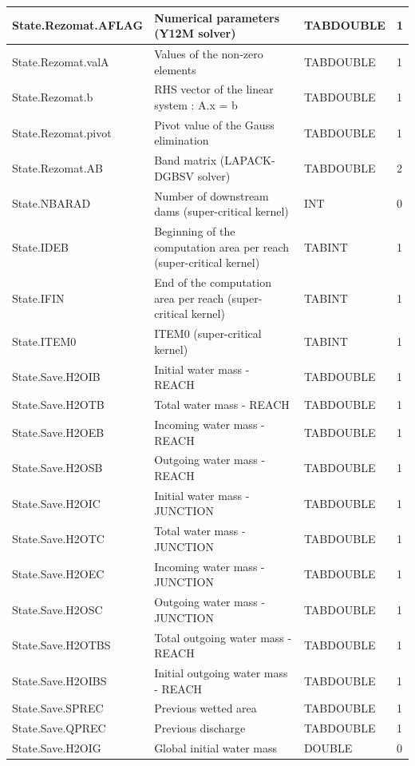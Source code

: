 \documentclass[a4paper,11pt]{article}
\begin{document}
\begin{landscape}
\begin{table}[ht]
\begin{center}
\begin{tabular}{|l|l|l|l|}
\hline  State.Rezomat.AFLAG & Numerical parameters (Y12M solver) & TABDOUBLE & 1 \\
\hline  State.Rezomat.valA & Values of the non-zero elements & TABDOUBLE & 1 \\
\hline  State.Rezomat.b & RHS vector of the linear system : A.x = b & TABDOUBLE & 1 \\
\hline  State.Rezomat.pivot & Pivot value of the Gauss elimination & TABDOUBLE & 1 \\
\hline  State.Rezomat.AB & Band matrix (LAPACK-DGBSV solver) & TABDOUBLE & 2 \\
\hline  State.NBARAD & Number of downstream dams (super-critical kernel) & INT & 0 \\
\hline  State.IDEB & Beginning of the computation area per reach (super-critical kernel) & TABINT & 1 \\
\hline  State.IFIN & End of the computation area per reach (super-critical kernel) & TABINT & 1 \\
\hline  State.ITEM0 & ITEM0 (super-critical kernel) & TABINT & 1 \\
\hline  State.Save.H2OIB & Initial water mass - REACH & TABDOUBLE & 1 \\
\hline  State.Save.H2OTB & Total water mass - REACH & TABDOUBLE & 1 \\
\hline  State.Save.H2OEB & Incoming water mass - REACH & TABDOUBLE & 1 \\
\hline  State.Save.H2OSB & Outgoing water mass - REACH & TABDOUBLE & 1 \\
\hline  State.Save.H2OIC & Initial water mass - JUNCTION & TABDOUBLE & 1 \\
\hline  State.Save.H2OTC & Total water mass - JUNCTION & TABDOUBLE & 1 \\
\hline  State.Save.H2OEC & Incoming water mass - JUNCTION & TABDOUBLE & 1 \\
\hline  State.Save.H2OSC & Outgoing water mass - JUNCTION & TABDOUBLE & 1 \\
\hline  State.Save.H2OTBS & Total outgoing water mass - REACH & TABDOUBLE & 1 \\
\hline  State.Save.H2OIBS & Initial outgoing water mass - REACH & TABDOUBLE & 1 \\
\hline  State.Save.SPREC & Previous wetted area & TABDOUBLE & 1 \\
\hline  State.Save.QPREC & Previous discharge & TABDOUBLE & 1 \\
\hline  State.Save.H2OIG & Global initial water mass & DOUBLE & 0 \\

\end{tabular}
\end{center}
\end{table}
\end{landscape}
\end{document}
